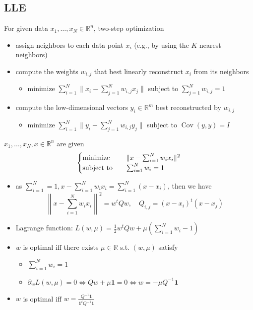 \subsection{LLE}
\begin{remark}
    For given data $x_1, \dots, x_N \in \mathbb{R}^n$, two-step optimization
    \begin{itemize}
        \item assign neighbors to each data point $x_i$ (e.g., by using the $K$ nearest neighbors)
        \item compute the weights $w_{i, j}$ that best linearly reconstruct $x_i$ from its neighbors\begin{itemize}
            \item minimize $\sum_{i = 1}^N \|x_i - \sum_{j = 1}^Nw_{i, j}x_j\|$ subject to $\sum_{j = 1}^Nw_{i, j} = 1$
        \end{itemize}
        \item compute the low-dimensional vectors $y_i \in \mathbb{R}^m$ best reconstructed by $w_{i, j}$\begin{itemize}
            \item minimize $\sum_{i = 1}^N \|y_i - \sum_{j = 1}^Nw_{i, j}y_j\|$ subject to $\operatorname{Cov}(y, y) = I$
        \end{itemize}
    \end{itemize}
\end{remark}

\begin{remark}
    $x_1, \dots, x_N, x \in \mathbb{R}^n$ are given\[\begin{cases}
        \operatorname{minimize} \quad &\|x - \sum_{i = 1}^Nw_ix_i\|^2\\
        \operatorname{subject\ to}\quad &\sum_{i = 1}^Nw_i = 1
    \end{cases}\]
    \begin{itemize}
        \item as $\sum_{i = 1}^N = 1, x - \sum_{i = 1}^N w_ix_i = \sum_{i = 1}^N(x - x_i)$, then we have \[\left\|x-\sum_{i=1}^{N} w_{i} x_{i}\right\|^{2}=w^{t} Q w, \quad Q_{i, j}=\left(x-x_{i}\right)^{t}\left(x-x_{j}\right)\]
        \item Lagrange function: $L(w, \mu) = \frac{1}{2}w^tQw + \mu(\sum_{i = 1}^N w_i - 1)$
        \item $w$ is optimal iff there exists $\mu \in \mathbb{R}$ s.t. $(w, \mu)$ satisfy\begin{itemize}
            \item $\sum_{i = 1}^N w_i = 1$
            \item $\partial_{w} L(w, \mu)=0 \Longleftrightarrow Q w+\mu \mathbf{1}=0 \Longleftrightarrow w=-\mu Q^{-1} \mathbf{1}$
        \end{itemize}
        \item $w$ is optimal iff $w = \frac{Q^{-1}\mathbf{1}}{\mathbf{1}^tQ^{-1}\mathbf{1}}$
    \end{itemize}
\end{remark}


